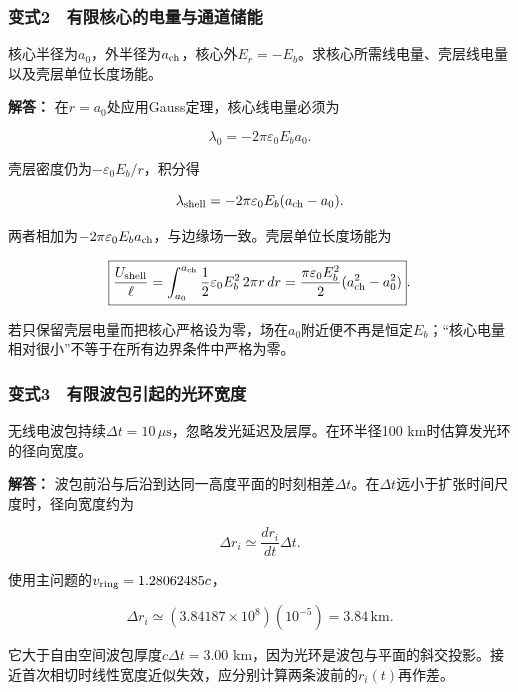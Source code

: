\documentclass[12pt,a4paper,fontset=fandol]{ctexart}
\begin{document}
\subsubsection{变式2　有限核心的电量与通道储能}\label{ux53d8ux5f0f2-ux6709ux9650ux6838ux5fc3ux7684ux7535ux91cfux4e0eux901aux9053ux50a8ux80fd}

核心半径为\(a_0\)，外半径为\(a_{\rm ch}\)，核心外\(E_r=-E_b\)。求核心所需线电量、壳层线电量以及壳层单位长度场能。

\textbf{解答：} 在\(r=a_0\)处应用Gauss定理，核心线电量必须为

\[
\boxed{\lambda_0=-2\pi\varepsilon_0E_ba_0}.
\]

壳层密度仍为\(-\varepsilon_0E_b/r\)，积分得

\[
\lambda_{\rm shell}
=-2\pi\varepsilon_0E_b(a_{\rm ch}-a_0).
\]

两者相加为\(-2\pi\varepsilon_0E_ba_{\rm ch}\)，与边缘场一致。壳层单位长度场能为

\[
\boxed{
\frac{U_{\rm shell}}{\ell}
=\int_{a_0}^{a_{\rm ch}}\frac12\varepsilon_0E_b^2\,2\pi r\,dr
=\frac{\pi\varepsilon_0E_b^2}{2}
(a_{\rm ch}^2-a_0^2)}.
\]

若只保留壳层电量而把核心严格设为零，场在\(a_0\)附近便不再是恒定\(E_b\)；``核心电量相对很小''不等于在所有边界条件中严格为零。

\subsubsection{变式3　有限波包引起的光环宽度}\label{ux53d8ux5f0f3-ux6709ux9650ux6ce2ux5305ux5f15ux8d77ux7684ux5149ux73afux5bbdux5ea6}

无线电波包持续\(\Delta t=10\,\mu\mathrm s\)，忽略发光延迟及层厚。在环半径100
km时估算发光环的径向宽度。

\textbf{解答：}
波包前沿与后沿到达同一高度平面的时刻相差\(\Delta t\)。在\(\Delta t\)远小于扩张时间尺度时，径向宽度约为

\[
\Delta r_i\simeq\frac{dr_i}{dt}\Delta t.
\]

使用主问题的\(v_{\rm ring}=1.28062485c\)，

\[
\boxed{
\Delta r_i\simeq
(3.84187\times10^8)(10^{-5})
=3.84\,\mathrm{km}}.
\]

它大于自由空间波包厚度\(c\Delta t=3.00\)
km，因为光环是波包与平面的斜交投影。接近首次相切时线性宽度近似失效，应分别计算两条波前的\(r_i(t)\)再作差。
\end{document}
